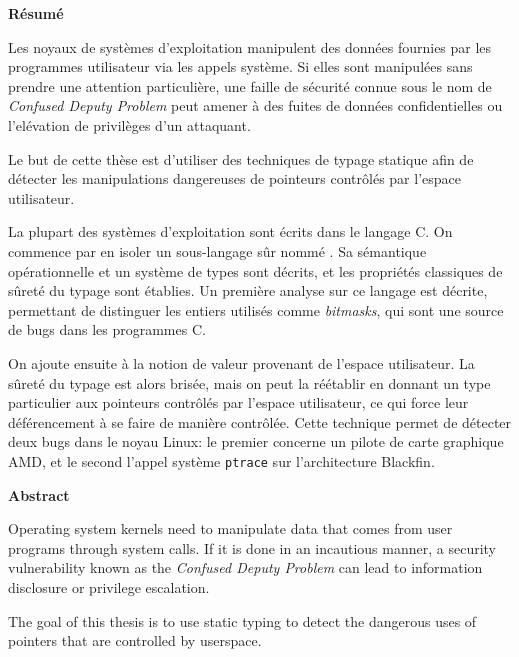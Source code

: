 \cleartoverso{}

\begin{headingpage}
\thispagestyle{empty}

\begin{center}\Large \textbf{Résumé}\end{center}

Les noyaux de systèmes d'exploitation manipulent des données fournies par les
programmes utilisateur via les appels système. Si elles sont manipulées sans
prendre une attention particulière, une faille de sécurité connue sous le nom de
\emph{Confused Deputy Problem} peut amener à des fuites de données
confidentielles ou l'elévation de privilèges d'un attaquant.

Le but de cette thèse est d'utiliser des techniques de typage statique afin de
détecter les manipulations dangereuses de pointeurs contrôlés par l'espace
utilisateur.

La plupart des systèmes d'exploitation sont écrits dans le langage C. On
commence par en isoler un sous-langage sûr nommé \langname{}. Sa sémantique
opérationnelle et un système de types sont décrits, et les propriétés classiques
de sûreté du typage sont établies. Un première analyse sur ce langage est
décrite, permettant de distinguer les entiers utilisés comme \emph{bitmasks},
qui sont une source de bugs dans les programmes C.

On ajoute ensuite à \langname{} la notion de valeur provenant de
l'espace utilisateur. La sûreté du typage est alors brisée, mais on peut la
réétablir en donnant un type particulier aux pointeurs contrôlés par l'espace
utilisateur, ce qui force leur déférencement à se faire de manière contrôlée.
Cette technique permet de détecter deux bugs dans le noyau Linux: le premier
concerne un pilote de carte graphique AMD, et le second l'appel système
\texttt{ptrace} sur l'architecture Blackfin.

\begin{center}\Large \textbf{Abstract}\end{center}

Operating system kernels need to manipulate data that comes from user programs
through system calls. If it is done in an incautious manner, a security
vulnerability known as the \emph{Confused Deputy Problem} can lead to
information disclosure or privilege escalation.

The goal of this thesis is to use static typing to detect the dangerous uses of
pointers that are controlled by userspace.


\end{headingpage}
